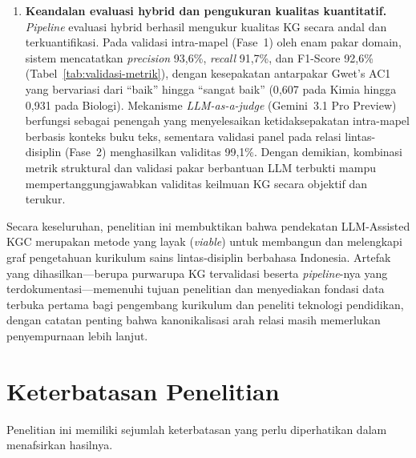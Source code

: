\documentclass[main]{subfiles}
\begin{document}
\begin{enumerate}
  \item \textbf{Keandalan evaluasi hybrid dan pengukuran kualitas kuantitatif.}
        \textit{Pipeline} evaluasi hybrid berhasil mengukur kualitas KG secara
        andal dan terkuantifikasi. Pada validasi intra-mapel (Fase~1) oleh enam
        pakar domain, sistem mencatatkan \textit{precision} 93{,}6\%,
        \textit{recall} 91{,}7\%, dan F1-Score 92{,}6\%
        (Tabel~\ref{tab:validasi-metrik}), dengan kesepakatan antarpakar Gwet's
        AC1 yang bervariasi dari ``baik'' hingga ``sangat baik'' (0{,}607 pada
        Kimia hingga 0{,}931 pada Biologi). Mekanisme \textit{LLM-as-a-judge}
        (Gemini~3.1 Pro Preview) berfungsi sebagai penengah yang menyelesaikan
        ketidaksepakatan intra-mapel berbasis konteks buku teks, sementara
        validasi panel pada relasi lintas-disiplin (Fase~2) menghasilkan
        validitas 99{,}1\%. Dengan demikian, kombinasi metrik struktural dan
        validasi pakar berbantuan LLM terbukti mampu mempertanggungjawabkan
        validitas keilmuan KG secara objektif dan terukur.
\end{enumerate}

Secara keseluruhan, penelitian ini membuktikan bahwa pendekatan LLM-Assisted KGC
merupakan metode yang layak (\textit{viable}) untuk membangun dan melengkapi graf
pengetahuan kurikulum sains lintas-disiplin berbahasa Indonesia. Artefak yang
dihasilkan---berupa purwarupa KG tervalidasi beserta \textit{pipeline}-nya yang
terdokumentasi---memenuhi tujuan penelitian dan menyediakan fondasi data terbuka
pertama bagi pengembang kurikulum dan peneliti teknologi pendidikan, dengan catatan
penting bahwa kanonikalisasi arah relasi masih memerlukan penyempurnaan lebih lanjut.

\section{Keterbatasan Penelitian}

Penelitian ini memiliki sejumlah keterbatasan yang perlu diperhatikan dalam
menafsirkan hasilnya.
\end{document}
